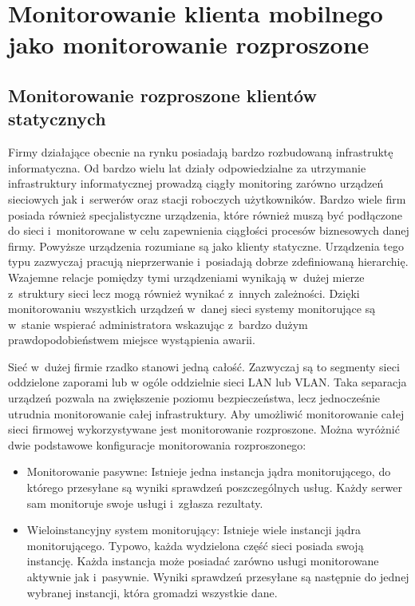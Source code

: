 \chapter{Monitorowanie klienta mobilnego jako monitorowanie rozproszone}
\label{chap:Wymagania}

\section[Monitorowanie rozproszone][Monitorowanie rozproszone klientów
statycznych]{Monitorowanie rozproszone klientów statycznych}

Firmy działające obecnie na rynku posiadają bardzo rozbudowaną
infrastruktę informatyczna. Od bardzo wielu lat działy odpowiedzialne
za utrzymanie infrastruktury informatycznej prowadzą ciągły monitoring
zarówno urządzeń sieciowych jak i~serwerów oraz stacji roboczych
użytkowników. Bardzo wiele firm posiada również specjalistyczne
urządzenia, które również muszą być podłączone do sieci i~monitorowane
w celu zapewnienia ciągłości procesów biznesowych danej
firmy. Powyższe urządzenia rozumiane są jako klienty
statyczne. Urządzenia tego typu zazwyczaj pracują nieprzerwanie
i~posiadają dobrze zdefiniowaną hierarchię. Wzajemne relacje pomiędzy
tymi urządzeniami wynikają w~dużej mierze z~struktury sieci lecz mogą
również wynikać z~innych zależności. Dzięki monitorowaniu wszystkich
urządzeń w~danej sieci systemy monitorujące są w~stanie wspierać
administratora wskazując z~bardzo dużym prawdopodobieństwem miejsce
wystąpienia awarii.

Sieć w~dużej firmie rzadko stanowi jedną całość. Zazwyczaj są to
segmenty sieci oddzielone zaporami lub w ogóle oddzielnie sieci LAN
lub VLAN. Taka separacja urządzeń pozwala na zwiększenie poziomu
bezpieczeństwa, lecz jednocześnie utrudnia monitorowanie całej
infrastruktury. Aby umożliwić monitorowanie całej sieci firmowej
wykorzystywane jest monitorowanie rozproszone. Można wyróżnić dwie
podstawowe konfiguracje monitorowania rozproszonego:

\begin{itemize}
\item Monitorowanie pasywne: Istnieje jedna instancja jądra
  monitorującego, do którego przesyłane są wyniki sprawdzeń
  poszczególnych usług. Każdy serwer sam monitoruje swoje usługi
  i~zgłasza rezultaty.
\item Wieloinstancyjny system monitorujący: Istnieje wiele instancji
  jądra monitorującego. Typowo, każda wydzielona część sieci posiada
  swoją instancję. Każda instancja może posiadać zarówno usługi
  monitorowane aktywnie jak i~pasywnie. Wyniki sprawdzeń przesyłane są
  następnie do jednej wybranej instancji, która gromadzi wszystkie
  dane.
\end{itemize}


